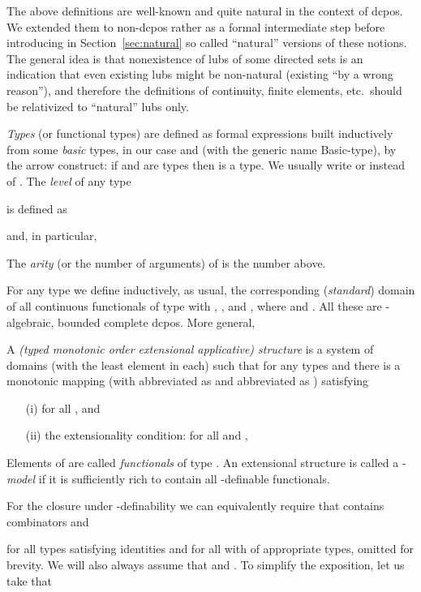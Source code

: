 \documentclass[fleqn]{LMCS}
\theoremstyle{plain}\newtheorem{satz}[thm]{Satz}
\theoremstyle{plain}\newtheorem{hyp}[thm]{Hypothesis}
\theoremstyle{plain}\newtheorem{hyps}[thm]{Hypotheses}
\theoremstyle{definition}\newtheorem{note}[thm]{Note}
\newcommand{\?}{\mbox{?}}
\begin{document}
The above definitions are well-known and quite natural in the context of dcpos. 
We extended them to non-dcpos rather 
as a formal intermediate step 
before introducing in Section~\ref{sec:natural} so called ``natural'' versions 
of these notions. The general idea is that nonexistence of lubs of some 
directed sets is an indication that even existing lubs might be non-natural 
(existing ``by a wrong reason''), and 
therefore the definitions of continuity, finite elements, etc.\ should 
be relativized to ``natural'' lubs only. 


{\em Types} (or functional types) are defined as formal expressions
built inductively from some {\em basic\/} types, in our case 
and  
(with the generic name \mbox{Basic-type}), 
by the arrow construct: if  and  are types
then  is a type. We usually write
 or 
 instead of
.
The \emph{level} of any type

is defined as

and, in particular, 

The \emph{arity} (or the number of arguments) 
of  is the number  above. 

For any type  we define inductively, as usual, 
the corresponding (\emph{standard}) domain  of
all {continuous} functionals of type  
with , , 
and ,
where  and 
. 
All these  are -algebraic, bounded complete dcpos. 
More general, 
\begin{defi}A \emph{(typed monotonic order extensional 
applicative) structure}  is a system of domains 
(with the least element  in each) such that 
for any types  and  there is a monotonic 
mapping 
 (with 
 abbreviated as  and 
 abbreviated as ) 
satisfying 
\begin{itemize}
\item[(i)]  for all 
, and 
\item[(ii)]the extensionality condition: for all  and 
,

\end{itemize}
Elements of  
are called \emph{functionals} of type .
An extensional structure  is called a -\emph{model} 
if it is sufficiently rich to contain all 
-definable functionals. 
\end{defi}
For the closure under -definability we can equivalently require that 
 contains combinators 
 and 

for all types  satisfying identities 
 and  for all  
with  of appropriate types, omitted for brevity. 
We will also always assume that 
 and . 
To simplify the exposition, let us take that 
 
\end{document}
